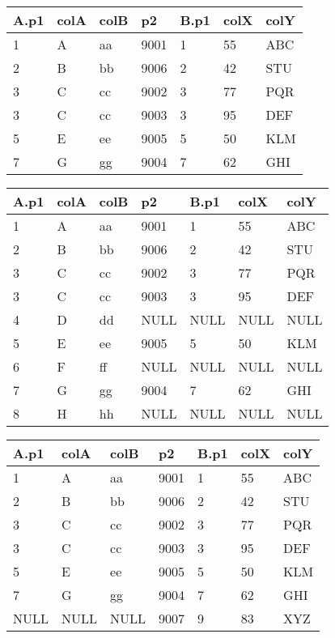 \documentclass[10pt, a4paper, ngerman]{arbeitsblatt}
\begin{document}
\begin{aufgabe}
\begin{tabular}{*{7}{l}} \hline
	\rowcolor{ab.tabelle.kopf.hg}
	A.p1 & colA & colB & p2 & B.p1 & colX & colY      \\
	\hline\midrule
	1 & A & aa & 9001 & 1 & 55 & ABC \\\midrule
	2 & B & bb & 9006 & 2 & 42 & STU \\\midrule
	3 & C & cc & 9002 & 3 & 77 & PQR \\\midrule
	3 & C & cc & 9003 & 3 & 95 & DEF \\\midrule
	5 & E & ee & 9005 & 5 & 50 & KLM \\\midrule
	7 & G & gg & 9004 & 7 & 62 & GHI \\\bottomrule
\end{tabular}

\begin{tabular}{|*{7}{l|}}\hline
	\rowcolor{ab.tabelle.kopf.hg}
	A.p1 & colA & colB & p2 & B.p1 & colX & colY      \\
	\hline
	1 & A & aa & 9001 & 1 & 55 & ABC \\\hline
	2 & B & bb & 9006 & 2 & 42 & STU \\\hline
	3 & C & cc & 9002 & 3 & 77 & PQR \\\hline
	3 & C & cc & 9003 & 3 & 95 & DEF \\\hline
	4 & D & dd & NULL & NULL & NULL & NULL\\\hline
	5 & E & ee & 9005 & 5 & 50 & KLM \\\hline
	6 & F & ff & NULL & NULL & NULL & NULL \\\hline
	7 & G & gg & 9004 & 7 & 62 & GHI \\\hline
	8 & H & hh & NULL & NULL & NULL & NULL \\\hline
\end{tabular}

\begin{tabular}{|*{7}{l|}}\hline
	\rowcolor{ab.tabelle.kopf.hg}
	A.p1 & colA & colB & p2 & B.p1 & colX & colY      \\
	\hline
	1 & A & aa & 9001 & 1 & 55 & ABC \\\hline
	2 & B & bb & 9006 & 2 & 42 & STU \\\hline
	3 & C & cc & 9002 & 3 & 77 & PQR \\\hline
	3 & C & cc & 9003 & 3 & 95 & DEF \\\hline
	5 & E & ee & 9005 & 5 & 50 & KLM \\\hline
	7 & G & gg & 9004 & 7 & 62 & GHI \\\hline
	NULL & NULL & NULL & 9007 & 9 & 83 & XYZ \\\hline
\end{tabular}


\end{aufgabe}
\end{document}
